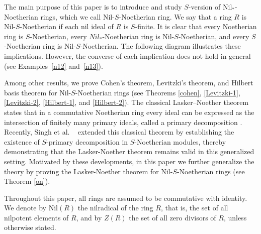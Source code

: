 \documentclass[11pt]{article}
\begin{document}
   The main  purpose of this paper is to introduce and study  $S$-version of Nil$_{*}$-Noetherian rings, which we  call Nil-$S$-Noetherian ring.
   	We say that a ring $R$ is  Nil-$S$-Noetherian if each nil ideal of $R$ is $S$-finite.
    It is clear that every Noetherian ring is $S$-Noetherian, every $Nil_{*}$-Noetherian ring is Nil-$S$-Noetherian, and every $S$-Noetherian ring is Nil-$S$-Noetherian. The following diagram illustrates these implications. However, the converse of each implication does not hold in general (see Examples~\ref{n12} and~\ref{n13}).
\begin{center}

\end{center}
Among other results, we prove Cohen's theorem, Levitzki's theorem, and Hilbert basis theorem for Nil-$S$-Noetherian rings (see Theorems \ref{cohen}, \ref{Levitzki-1}, \ref{Levitzki-2}, \ref{Hilbert-1}, and \ref{Hilbert-2}). 
The classical Lasker--Noether theorem states that in a commutative Noetherian ring every ideal can be expressed as the intersection of finitely many primary ideals, called a primary decomposition \cite{le05, ne21}. 
Recently, Singh et al. ~\cite{ts24} extended this classical theorem by establishing the existence of $S$-primary decomposition in $S$-Noetherian modules, thereby demonstrating that the Lasker-Noether theorem remains valid in this generalized setting. Motivated by these developments, in this paper we further generalize the theory by proving the Lasker-Noether theorem for Nil-$S$-Noetherian rings (see Theorem \ref{on}).


  
  Throughout this paper, all rings are assumed to be commutative with identity. We denote by $\mathrm{Nil}(R)$ the nilradical of the ring  $R$, that is, the set of all nilpotent elements of $R$, and by $Z(R)$ the set of all zero divisors of $R$, unless otherwise stated.
  
\end{document}
